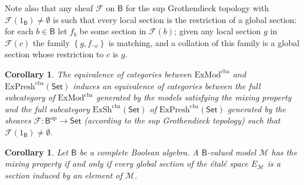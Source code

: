 \documentclass[11pt]{amsart}
\newcommand{\F}{\mathcal{F}}
\newcommand{\malg}{\bool{MALG}}
\newcommand{\Null}{\mathrm{Null}}
\newcommand{\exPresh}{\textrm{ExPresh}}
\newcommand{\exSh}{\textrm{ExSh}}
\newcommand{\exmodxx}{\textrm{ExMod}^{\textrm{cba}}}
\theoremstyle{plain}
\newtheorem{corollary}[theorem]{Corollary}
\theoremstyle{definition}
\newtheorem{example}[theorem]{Example}
\theoremstyle{plain}
\theoremstyle{remark}
\newcommand{\M}{\mathcal{M}}
\newcommand{\dSet}{\mathsf{Set}}
\DeclareMathOperator{\St}{St}
\newcommand{\bool}[1]{\mathsf{#1}}
\newcommand{\analytic}[1]{C^\omega(#1)}
\newcommand{\bp}[1]{\left\lbrace #1 \right\rbrace}
\newcommand{\0}{\mathsf{0}}
\renewcommand{\1}{\mathsf{1}}
\renewcommand{\2}{\mathsf{2}}
\theoremstyle{definition}
\newcommand{\R}{\mathbb{R}} %
\begin{document}
Note also that any sheaf $\F$ on $\bool{B}$ for the sup Grothendieck topology with $\F(1_\bool{B})\neq \emptyset$ is such that every local section is the restriction 
of a global section: for each $b\in\bool{B}$ let $f_b$ be some section in $\F(b)$;
given any local section $g$ in $\F(c)$ the family $\bp{g,f_{\neg c}}$ is matching, 
and a collation of this family is a global section whose restriction to $c$ is $g$.

\begin{corollary}
The equivalence of categories between $\exmodxx$ and $\exPresh^{\textrm{cba}}(\dSet)$ induces an equivalence of categories between the full subcategory of $\exmodxx$ generated by the models satisfying the mixing property and the full subcategory $\exSh^{\textrm{cba}}(\dSet)$ of $\exPresh^{\textrm{cba}}(\dSet)$ generated by the sheaves $\F:\bool{B}^{\textrm{op}}\to\dSet$ (according to the sup Grothendieck topology) such that $\F(1_\bool{B})\neq \emptyset$.
\end{corollary}


\begin{corollary}\label{char:Gamma0=Gamma1}
Let $\bool{B}$ be a complete Boolean algebra.
A $\bool{B}$-valued model $\M$ has the mixing property if and only if every global section of the \'etal\'e space 
$E_\M$ is a section induced by an element of $\M$.
\end{corollary}


\end{document}
